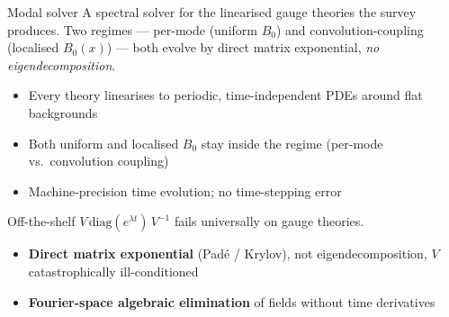 \begin{frame}{Modal solver}
  A spectral solver for the linearised gauge theories the survey
  produces. Two regimes --- per-mode (uniform $B_0$) and convolution-coupling (localised $B_0(x)$) --- both evolve by direct matrix
  exponential, \emph{no eigendecomposition}.

  \vspace{0.25em}
  \begin{itemize}\footnotesize
    \item Every theory linearises to periodic, time-independent PDEs around flat backgrounds
    \item Both uniform and localised $B_0$ stay inside the regime (per-mode vs.\ convolution coupling)
    \item Machine-precision time evolution; no time-stepping error
      \end{itemize}

  Off-the-shelf $V\,\mathrm{diag}(e^{\lambda t})\,V^{-1}$ fails universally on gauge theories.
  \begin{itemize}\footnotesize
    \item \textbf{Direct matrix exponential} (Pad\'e / Krylov),
          not eigendecomposition, $V$ catastrophically ill-conditioned
    \item \textbf{Fourier-space algebraic elimination} of fields
          without time derivatives
      \end{itemize}

\end{frame}
